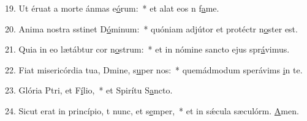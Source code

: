 19. Ut éruat a morte ánmas e\uline{ó}rum:~* et alat eos n f\uline{a}me.\par 
20. Anima nostra sstinet D\uline{ó}minum:~* quóniam adjútor et protéctr n\uline{o}ster est.\par 
21. Quia in eo lætábtur cor n\uline{o}strum:~* et in nómine sancto ejus spr\uline{á}vimus.\par 
22. Fiat misericórdia tua, Dmine, s\uline{u}per nos:~* quemádmodum sperávims \uline{i}n te.\par 
23. Glória Ptri, et F\uline{í}lio,~* et Spirítu S\uline{a}ncto.\par 
24. Sicut erat in princípio, t nunc, et s\uline{e}mper,~* et in sǽcula sæculórm. \uline{A}men.\par 
